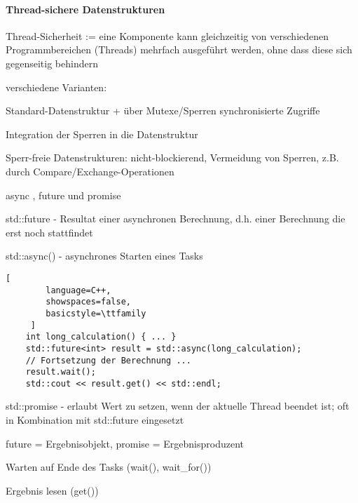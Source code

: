 \documentclass[10pt]{article}
\begin{document}
\begin{itemize*}
\paragraph{Thread-sichere Datenstrukturen}
\begin{itemize*}
  \item Thread-Sicherheit := eine Komponente kann gleichzeitig von verschiedenen Programmbereichen (Threads) mehrfach ausgeführt werden, ohne dass diese sich gegenseitig behindern
  \item verschiedene Varianten:
  \begin{itemize*}
    \item Standard-Datenstruktur + über Mutexe/Sperren synchronisierte Zugriffe
    \item Integration der Sperren in die Datenstruktur
    \item Sperr-freie Datenstrukturen: nicht-blockierend, Vermeidung von Sperren, z.B. durch Compare/Exchange-Operationen
  \end{itemize*}
  \item async , future und promise
  \item std::future - Resultat einer asynchronen Berechnung, d.h. einer Berechnung die erst noch stattfindet
  \item std::async() - asynchrones Starten eines Tasks
  \begin{lstlisting}[
        language=C++,
        showspaces=false,
        basicstyle=\ttfamily
     ]
    int long_calculation() { ... }
    std::future<int> result = std::async(long_calculation);
    // Fortsetzung der Berechnung ...
    result.wait();
    std::cout << result.get() << std::endl;
    \end{lstlisting}
  \item std::promise - erlaubt Wert zu setzen, wenn der aktuelle Thread beendet ist; oft in Kombination mit std::future eingesetzt
  \item future = Ergebnisobjekt, promise = Ergebnisproduzent
  \begin{itemize*}
    \item Warten auf Ende des Tasks (wait(), wait\_for())
    \item Ergebnis lesen (get())
  \end{itemize*}
\end{itemize*}



\end{itemize*}
\end{document}
